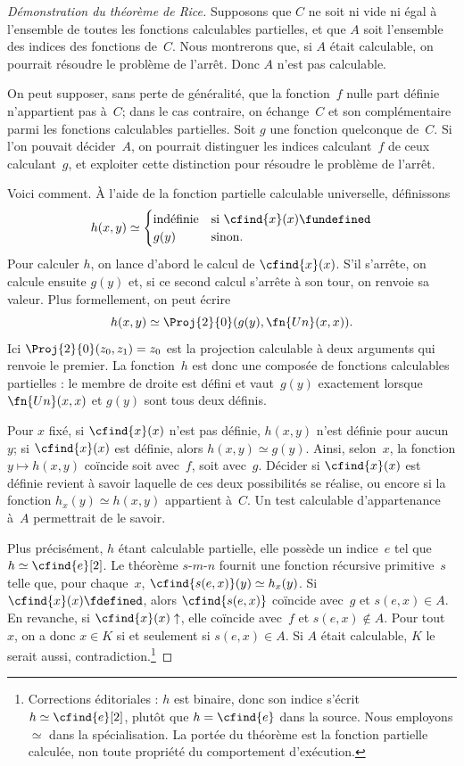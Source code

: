 \documentclass[../../../include/open-logic-section]{subfiles}
\begin{document}
\begin{proof}[Démonstration du théorème de Rice]
Supposons que $C$ ne soit ni vide ni égal à
l'ensemble de toutes les fonctions calculables
partielles, et que $A$ soit l'ensemble des indices
des fonctions de~$C$. Nous montrerons que, si
$A$ était calculable, on pourrait résoudre le
problème de l'arrêt. Donc $A$ n'est pas calculable.

On peut supposer, sans perte de généralité,
que la fonction~$f$ nulle part définie n'appartient
pas à~$C$; dans le cas contraire, on échange~$C$
et son complémentaire parmi les fonctions
calculables partielles. Soit $g$ une fonction
quelconque de~$C$. Si l'on pouvait décider~$A$,
on pourrait distinguer les indices calculant~$f$
de ceux calculant~$g$, et exploiter cette
distinction pour résoudre le problème de l'arrêt.

Voici comment. À l'aide de la fonction partielle
calculable universelle, définissons
\[
h(x,y) \simeq
\begin{cases}
\text{indéfinie} & \text{si $\cfind{x}(x) \fundefined$} \\
g(y) & \text{sinon.}
\end{cases}
\]
Pour calculer $h$, on lance d'abord le calcul
de $\cfind{x}(x)$. S'il s'arrête, on calcule
ensuite $g(y)$ et, si ce second calcul s'arrête
à son tour, on renvoie sa valeur. Plus
formellement, on peut écrire
\[
h(x,y) \simeq \Proj{2}{0}(g(y),\fn{Un}(x,x)).
\]
Ici $\Proj{2}{0}(z_0,z_1)=z_0$ est la projection
calculable à deux arguments qui renvoie le
premier. La fonction~$h$ est donc une composée
de fonctions calculables partielles : le membre
de droite est défini et vaut~$g(y)$ exactement
lorsque $\fn{Un}(x,x)$ et $g(y)$ sont tous deux
définis.

Pour $x$ fixé, si $\cfind{x}(x)$ n'est pas
définie, $h(x,y)$ n'est définie pour aucun~$y$;
si $\cfind{x}(x)$ est définie, alors
$h(x,y)\simeq g(y)$. Ainsi, selon~$x$,
la fonction $y\mapsto h(x,y)$ coïncide soit
avec~$f$, soit avec~$g$. Décider si
$\cfind{x}(x)$ est définie revient à savoir
laquelle de ces deux possibilités se réalise,
ou encore si la fonction
$h_x(y)\simeq h(x,y)$ appartient à~$C$.
Un test calculable d'appartenance à~$A$
permettrait de le savoir.

Plus précisément, $h$ étant calculable partielle,
elle possède un indice~$e$ tel que
$h\simeq\cfind{e}[2]$. Le théorème
$s$-$m$-$n$ fournit une fonction récursive
primitive~$s$ telle que, pour chaque~$x$,
$\cfind{s(e,x)}(y)\simeq h_x(y)$.
Si $\cfind{x}(x)\fdefined$, alors
$\cfind{s(e,x)}$ coïncide avec~$g$ et
$s(e,x)\in A$. En revanche, si
$\cfind{x}(x)\uparrow$, elle coïncide
avec~$f$ et $s(e,x)\notin A$. Pour tout~$x$,
on a donc $x\in K$ si et seulement si
$s(e,x)\in A$. Si $A$ était calculable,
$K$ le serait aussi, contradiction.\footnote{Corrections éditoriales : $h$ est binaire, donc son indice s'écrit $h\simeq\cfind{e}[2]$, plutôt que $h=\cfind{e}$ dans la source. Nous employons $\simeq$ dans la spécialisation. La portée du théorème est la fonction partielle calculée, non toute propriété du comportement d'exécution.}
\end{proof}
\end{document}
